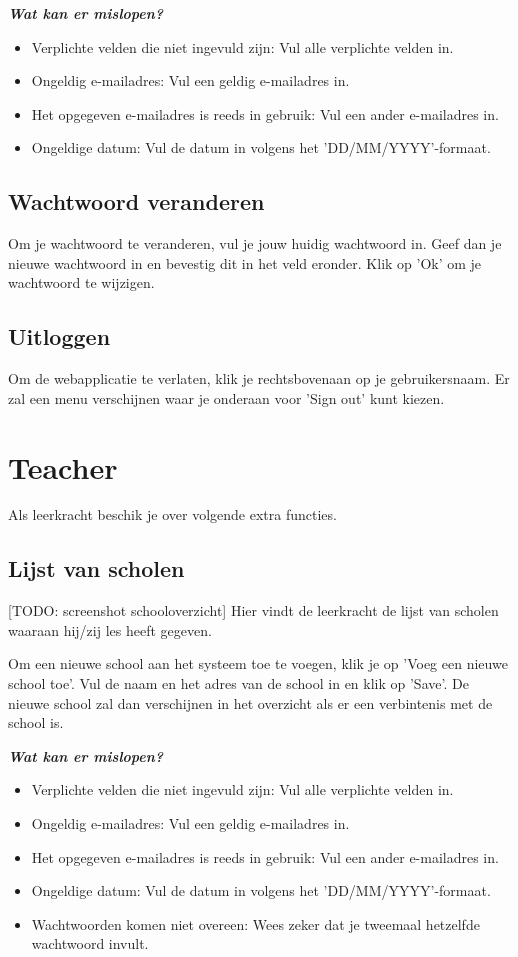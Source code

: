 \documentclass[]{article}
\begin{document}
\textbf{\textit{Wat kan er mislopen?}}

\begin{itemize}
\item Verplichte velden die niet ingevuld zijn: Vul alle verplichte velden in.
\item Ongeldig e-mailadres: Vul een geldig e-mailadres in.
\item Het opgegeven e-mailadres is reeds in gebruik: Vul een ander e-mailadres in.
\item Ongeldige datum: Vul de datum in volgens het 'DD/MM/YYYY'-formaat.
\end{itemize}

\subsection{Wachtwoord veranderen}
Om je wachtwoord te veranderen, vul je jouw huidig wachtwoord in. Geef dan je nieuwe wachtwoord in en bevestig dit in het veld eronder. Klik op 'Ok' om je wachtwoord te wijzigen.

\subsection{Uitloggen}
Om de webapplicatie te verlaten, klik je rechtsbovenaan op je gebruikersnaam. Er zal een menu verschijnen waar je onderaan voor 'Sign out' kunt kiezen.

\section{Teacher}

Als leerkracht beschik je over volgende extra functies.

\subsection{Lijst van scholen}

[TODO: screenshot schooloverzicht]
Hier vindt de leerkracht de lijst van scholen waaraan hij/zij les heeft gegeven.

Om een nieuwe school aan het systeem toe te voegen, klik je op 'Voeg een nieuwe school toe'. Vul de naam en het adres van de school in en klik op 'Save'. De nieuwe school zal dan verschijnen in het overzicht als er een verbintenis met de school is.

\textbf{\textit{Wat kan er mislopen?}}

\begin{itemize}
\item Verplichte velden die niet ingevuld zijn: Vul alle verplichte velden in.
\item Ongeldig e-mailadres: Vul een geldig e-mailadres in.
\item Het opgegeven e-mailadres is reeds in gebruik: Vul een ander e-mailadres in.
\item Ongeldige datum: Vul de datum in volgens het 'DD/MM/YYYY'-formaat.
\item Wachtwoorden komen niet overeen: Wees zeker dat je tweemaal hetzelfde wachtwoord invult.
\end{itemize}
\end{document}

